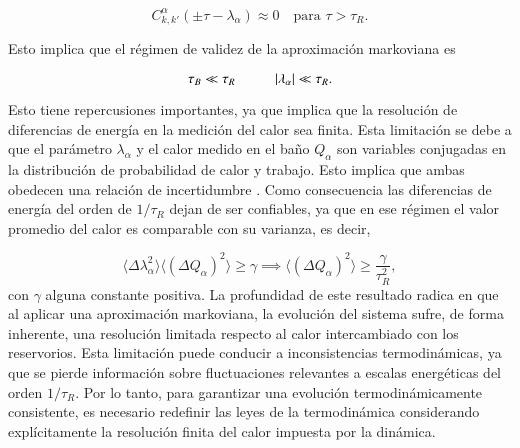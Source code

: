 \begin{equation*}
    C^{\alpha}_{k,k'}(\pm \tau - \lambda_\alpha) \approx 0 \quad \text{para } \tau > \tau_{R}.
\end{equation*}

Esto implica que el régimen de validez de la aproximación markoviana es 

\begin{equation*}
    \tau_{B} \ll \tau_{R} \hspace{10mm} |\lambda_{\alpha}| \ll \tau_{R}.
\end{equation*}

Esto tiene repercusiones importantes, ya que implica que la resolución de diferencias de energía en la medición del calor sea finita. Esta limitación se debe a que el parámetro $\lambda_{\alpha}$ y el calor medido en el baño $Q_{\alpha}$ son variables conjugadas en la distribución de probabilidad de calor y trabajo. Esto implica que ambas obedecen una relación de incertidumbre \cite{folland1997uncertainty}. Como consecuencia las diferencias de energía del orden de $1/\tau_{R}$ dejan de ser confiables, ya que en ese régimen el valor promedio del calor es comparable con su varianza, es decir,

\begin{equation*}
    \langle \Delta \lambda^{2}_{\alpha} \rangle \langle (\Delta Q_{\alpha})^{2}\rangle \geq \gamma \implies \langle (\Delta Q_{\alpha})^{2}\rangle  \geq \frac{\gamma}{\tau^{2}_{R}},
\end{equation*}
con $\gamma$ alguna constante positiva. La profundidad de este resultado radica en que al aplicar una aproximación markoviana, la evolución del sistema sufre, de forma inherente, una resolución limitada respecto al calor intercambiado con los reservorios. Esta limitación puede conducir a inconsistencias termodinámicas, ya que se pierde información sobre fluctuaciones relevantes a escalas energéticas del orden $1/\tau_{R}$. Por lo tanto, para garantizar una evolución termodinámicamente consistente, es necesario redefinir las leyes de la termodinámica considerando explícitamente la resolución finita del calor impuesta por la dinámica.

\label{sec2:finiteresol}

